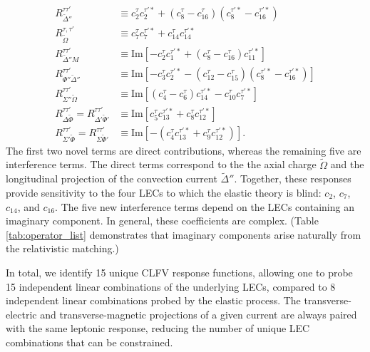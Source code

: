 \documentclass{book}[letterpaper,12pt]
\begin{document}
\begin{equation}
\begin{split}
R_{\tilde{\Delta}''}^{\tau\tau'}&\equiv c_2^{\tau}c_2^{\tau'*}+(c_8^{\tau}-c_{16}^{\tau})(c_8^{\tau'*}-c_{16}^{\tau'*})\\
R_{\tilde{\Omega}}^{\tau,\tau'}&\equiv c_7^{\tau}c_7^{\tau'*}+c_{14}^{\tau}c_{14}^{\tau'*}\\
R_{\tilde{\Delta}''M}^{\tau\tau'}&\equiv\mathrm{Im}\left[-c_2^{\tau}c_1^{\tau'*}+(c_8^{\tau}-c_{16}^{\tau})c_{11}^{\tau'*}\right]\\
R_{\Phi''\tilde{\Delta}''}^{\tau\tau'}&\equiv\mathrm{Im}\left[-c_3^{\tau}c_2^{\tau'*}-(c_{12}^{\tau}-c_{15}^{\tau})(c_8^{\tau'*}-c_{16}^{\tau'*})\right]\\
R_{\Sigma''\tilde{\Omega}}^{\tau\tau'}&\equiv\mathrm{Im}\left[(c_4^{\tau}-c_6^{\tau})c_{14}^{\tau'*}-c_{10}^{\tau}c_7^{\tau'*}\right]\\
R_{\Delta\tilde{\Phi}}^{\tau\tau'}=R_{\Delta'\tilde{\Phi}'}^{\tau\tau'}&\equiv\mathrm{Im}\left[c_5^{\tau}c_{13}^{\tau'*}+c_8^{\tau}c_{12}^{\tau'*}\right]\\
R_{\Sigma'\tilde{\Phi}}^{\tau\tau'}=R_{\Sigma\tilde{\Phi}'}^{\tau\tau'}&\equiv\mathrm{Im}\left[-\left(c_4^{\tau}c_{13}^{\tau'*}+c_9^{\tau}c_{12}^{\tau'*}\right)\right].
\end{split}
\end{equation}
The first two novel terms are direct contributions, whereas the remaining five are interference terms. The direct terms correspond to the the axial charge $\tilde{\Omega}$ and the longitudinal projection of the convection current $\tilde{\Delta}''$. Together, these responses provide sensitivity to the four LECs to which the elastic theory is blind: $c_2$, $c_7$, $c_{14}$, and $c_{16}$. The five new interference terms depend on the LECs containing an imaginary component. In general, these coefficients are complex. (Table \ref{tab:operator_list} demonstrates that imaginary components arise naturally from the relativistic matching.)

In total, we identify 15 unique CLFV response functions, allowing one to probe 15 independent linear combinations of the underlying LECs, compared to 8 independent linear combinations probed by the elastic process. The transverse-electric and transverse-magnetic projections of a given current are always paired with the same leptonic response, reducing the number of unique LEC combinations that can be constrained.
\end{document}
